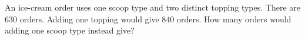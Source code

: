 An ice-cream order uses one scoop type and two distinct topping types. There are $630$ orders. Adding one topping would give $840$ orders. How many orders would adding one scoop type instead give?
